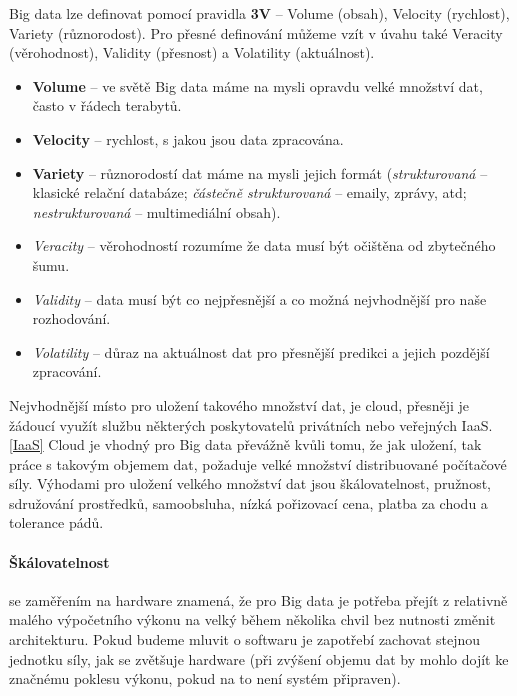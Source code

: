 \par Big data lze definovat pomocí pravidla \textbf{3V} -- Volume (obsah), Velocity (rychlost), Variety (různorodost). Pro přesné definování můžeme vzít v úvahu také Veracity (věrohodnost), Validity (přesnost) a Volatility (aktuálnost).\cite{big-data-anayitics}
\begin{itemize}
\item \textbf{Volume} -- ve světě Big data máme na mysli opravdu velké množství dat, často v řádech terabytů.
\item \textbf{Velocity} -- rychlost, s jakou jsou data zpracována.
\item \textbf{Variety} -- různorodostí dat máme na mysli jejich formát (\textit{strukturovaná} -- klasické relační databáze; \textit{částečně strukturovaná} -- emaily, zprávy, atd; \textit{nestrukturovaná} -- multimediální obsah).
\item \textit{Veracity} -- věrohodností rozumíme že data musí být očištěna od zbytečného šumu.
\item \textit{Validity} -- data musí být co nejpřesnější a co možná nejvhodnější pro naše rozhodování.
\item \textit{Volatility} -- důraz na aktuálnost dat pro přesnější predikci a jejich pozdější zpracování. \cite{big-data-anayitics}
\end{itemize}

Nejvhodnější místo pro uložení takového množství dat, je cloud, přesněji je žádoucí využít službu některých poskytovatelů privátních nebo veřejných IaaS. \ref{IaaS} Cloud je vhodný pro Big data převážně kvůli tomu, že jak uložení, tak práce s takovým objemem dat, požaduje velké množství distribuované počítačové síly. Výhodami pro uložení velkého množství dat jsou škálovatelnost, pružnost, sdružování prostředků, samoobsluha, nízká pořizovací cena, platba za chodu a tolerance pádů. \cite{big-data-dummies}

\paragraph{Škálovatelnost} se zaměřením na hardware znamená, že pro Big data je potřeba přejít z relativně malého výpočetního výkonu na velký během několika chvil bez nutnosti změnit architekturu. Pokud budeme mluvit o softwaru je zapotřebí zachovat stejnou jednotku síly, jak se zvětšuje hardware (při zvýšení objemu dat by mohlo dojít ke značnému poklesu výkonu, pokud na to není systém připraven). \cite{big-data-dummies}

